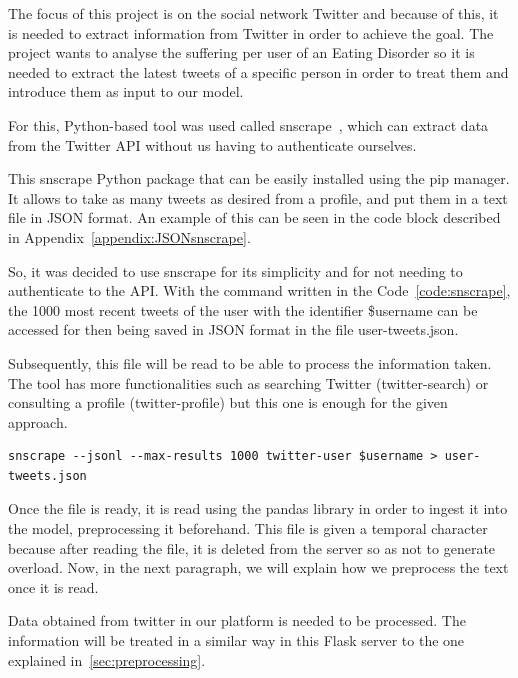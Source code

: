 The focus of this project is on the social network Twitter and because of this, it is needed to extract information from Twitter in order to achieve the goal. The project wants to analyse the suffering per user of an Eating Disorder so it is needed to extract the latest tweets of a specific person in order to treat them and introduce them as input to our model.

For this, Python-based tool was used called snscrape~\cite{JustAnot83:online}, which can extract data from the Twitter API without us having to authenticate ourselves. 

This snscrape Python package that can be easily installed using the pip manager. It allows to take as many tweets as desired from a profile, and put them in a text file in JSON format. An example of this can be seen in the code block described in Appendix~\ref{appendix:JSONsnscrape}.

So, it was decided to use snscrape for its simplicity and for not needing to authenticate to the API. With the command written in the Code~\ref{code:snscrape}, the 1000 most recent tweets of the user with the identifier \$username can be accessed for then being saved in JSON format in the file user-tweets.json.

Subsequently, this file will be read to be able to process the information taken. The tool has more functionalities such as searching Twitter (twitter-search) or consulting a profile (twitter-profile) but this one is enough for the given approach.

\begin{lstlisting}[caption={Command executed for obtaining tweets.}, label={code:snscrape}]
snscrape --jsonl --max-results 1000 twitter-user $username > user-tweets.json
\end{lstlisting}

Once the file is ready, it is read using the pandas library in order to ingest it into the model, preprocessing it beforehand. This file is given a temporal character because after reading the file, it is deleted from the server so as not to generate overload. Now, in the next paragraph, we will explain how we preprocess the text once it is read.

Data obtained from twitter in our platform is needed to be processed. The information will be treated in a similar way in this Flask server to the one explained in~\ref{sec:preprocessing}.

